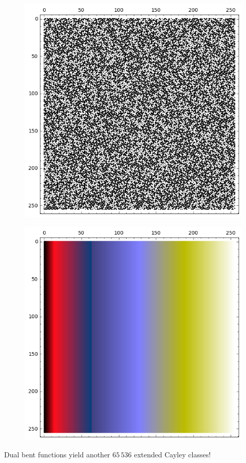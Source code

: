 \documentclass[pdf,sprung,slideColor,nocolorBG]{beamer}
\newenvironment{colortheme}[1]{
\def\ProvidesPackageRCS $##1${\relax}
\renewcommand{\ProcessOptions}{\relax}
\makeatletter

\makeatother
}{}
\begin{document}
\begin{colortheme}{jubata}
\begin{frame}
\begin{figure}
\begin{minipage}{.48\textwidth}
\includegraphics[width=.9\linewidth]{../matrix_plot/cast_128_1_0_weight_class_matrix.png}
  \label{fig:cast128_1_1_weight_class_matrix}
\end{minipage}
\begin{minipage}{.48\textwidth}
  \centering
\includegraphics[width=.9\linewidth]{../matrix_plot/cast_128_1_0_bent_cayley_graph_index_matrix.png}
  \label{fig:cast_128_1_1_bent_cayley_graph_index_matrix}
\end{minipage}%
\end{figure}
Dual bent functions yield another $65\,536$ extended Cayley classes!
\end{frame}

\end{colortheme}
\end{document}
